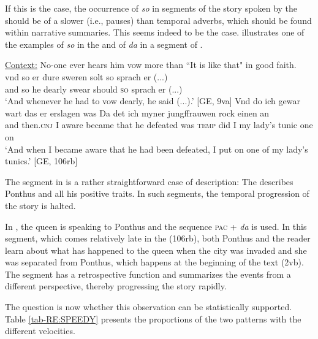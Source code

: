 \documentclass[output=paper,colorlinks,citecolor=brown]{langscibook}
\begin{document}
If this is the case, the occurrence of \textit{so} in segments of the story spoken by the  should be of a slower  (i.e., pauses) than temporal adverbs, which should be found within narrative summaries. This seems indeed to be the case.
 illustrates one of the examples of \textit{so} in the   and  of \textit{da} in a segment of .

\ea 
\ea \label{ex:GEdaC} 
\uline{Context:} No-one ever hears him vow more than ``It is like that" in good faith.\\
\gll vnd so er dure sweren solt so sprach er (...)\\
and so he dearly swear should \textsc{so} sprach er (...)\\
\glt `And whenever he had to vow dearly, he said (...).' \hfill [GE, 9va]
\ex \label{ex:GEsoN}
\gll 	 Vnd do ich gewar wart das er erslagen was Da det ich myner jungffrauwen rock einen an\\
and then.\textsc{cnj} I aware became that he defeated was \textsc{temp} did I my lady's tunic one on\\
\glt `And when I became aware that he had been defeated, I put on one of my lady's tunics.' \hfill [GE, 106rb]
\z
\z

\noindent The segment in  is a rather straightforward case of description: The  describes Ponthus and all his positive traits. In such segments, the temporal progression of the story is halted.

In , the queen is speaking to Ponthus and the sequence \textsc{pac} + \textit{da} is used. In this segment, which comes relatively late in the  (106rb), both Ponthus and the reader learn about what has happened to the queen when the city was invaded and she was separated from Ponthus, which happens at the beginning of the text (2vb). 
The segment has a retrospective function and summarizes the events from a different perspective, thereby progressing the story rapidly. 

The question is now whether this observation can be statistically supported. Table \ref{tab-RE:SPEEDY} presents the proportions of the two patterns with the different velocities. 
\end{document}
